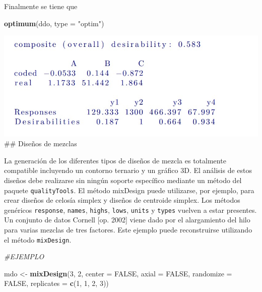 \documentclass[
]{book}
\newenvironment{Shaded}{\begin{snugshade}}{\end{snugshade}}
\newcommand{\AttributeTok}[1]{\textcolor[rgb]{0.13,0.29,0.53}{#1}}
\newcommand{\CommentTok}[1]{\textcolor[rgb]{0.56,0.35,0.01}{\textit{#1}}}
\newcommand{\ConstantTok}[1]{\textcolor[rgb]{0.56,0.35,0.01}{#1}}
\newcommand{\DecValTok}[1]{\textcolor[rgb]{0.00,0.00,0.81}{#1}}
\newcommand{\FunctionTok}[1]{\textcolor[rgb]{0.13,0.29,0.53}{\textbf{#1}}}
\newcommand{\NormalTok}[1]{#1}
\newcommand{\OtherTok}[1]{\textcolor[rgb]{0.56,0.35,0.01}{#1}}
\newcommand{\StringTok}[1]{\textcolor[rgb]{0.31,0.60,0.02}{#1}}
\begin{document}
Finalmente se tiene que

\begin{Shaded}
\begin{Highlighting}[]
\FunctionTok{optimum}\NormalTok{(ddo, }\AttributeTok{type =} \StringTok{"optim"}\NormalTok{)}
\end{Highlighting}
\end{Shaded}

\includegraphics[width=7.29167in,height=\textheight]{graficos/dario4.jpg}
\#\# Diseños de mezclas

La generación de los diferentes tipos de diseños de mezcla es totalmente compatible
incluyendo un contorno ternario y un gráfico 3D. El análisis de estos diseños debe realizarse sin ningún soporte específico mediante un método del paquete \texttt{qualityTools}.
El método mixDesign puede utilizarse, por ejemplo, para crear diseños de celosía simplex y diseños de centroide simplex.
Los métodos genéricos \texttt{response}, \texttt{names}, \texttt{highs}, \texttt{lows}, \texttt{units} y \texttt{types} vuelven a estar presentes.
Un conjunto de datos Cornell {[}op. 2002{]} viene dado por el alargamiento del hilo para varias mezclas de tres factores. Este ejemplo puede reconstruirse utilizando el método \texttt{mixDesign}.

\begin{Shaded}
\begin{Highlighting}[]
\CommentTok{\#EJEMPLO }

\NormalTok{mdo }\OtherTok{\textless{}{-}} \FunctionTok{mixDesign}\NormalTok{(}\DecValTok{3}\NormalTok{, }\DecValTok{2}\NormalTok{, }\AttributeTok{center =} \ConstantTok{FALSE}\NormalTok{, }\AttributeTok{axial =} \ConstantTok{FALSE}\NormalTok{, }\AttributeTok{randomize =} \ConstantTok{FALSE}\NormalTok{, }\AttributeTok{replicates =} \FunctionTok{c}\NormalTok{(}\DecValTok{1}\NormalTok{, }\DecValTok{1}\NormalTok{, }\DecValTok{2}\NormalTok{, }\DecValTok{3}\NormalTok{))}
\end{Highlighting}
\end{Shaded}
\end{document}
